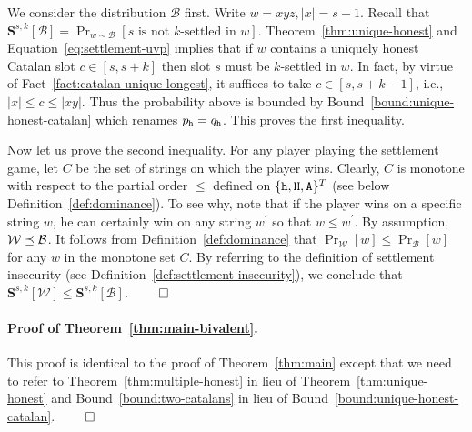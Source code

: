   We consider the distribution $\mathcal{B}$ first. 
  Write $w = xyz, |x| = s - 1$.
  Recall that  
  $
    \mathbf{S}^{s,k}[\mathcal{B}] 
    = \Pr_{w \sim \mathcal{B}}[\text{$s$ is not $k$-settled in $w$}]
  $. 
  Theorem~\ref{thm:unique-honest} and Equation~\eqref{eq:settlement-uvp} implies that 
  if $w$ contains a uniquely honest Catalan slot $c \in [s, s + k]$ 
  then slot $s$ must be $k$-settled in $w$. 
  In fact, by virtue of Fact~\ref{fact:catalan-unique-longest}, 
  it suffices to take $c \in [s, s + k - 1]$, 
  i.e., $|x| \leq c \leq |xy|$. 
  Thus the probability above is bounded by 
  Bound~\ref{bound:unique-honest-catalan} 
  which renames $p_{\mathtt{h}} = q_{\mathtt{h}}$.
  This proves the first inequality. 
  
  Now let us prove the second inequality. 
  For any player playing the settlement game, 
  let $C$ be the set of strings on which the player wins. 
  Clearly, $C$ is monotone 
  with respect to the partial order $\leq$ 
  defined on $\{\mathtt{h}, \mathtt{H}, \mathtt{A}\}^T$ 
  (see below Definition~\ref{def:dominance}).  
  To see why, note that if the player wins 
  on a specific string $w$, 
  he can certainly win on any string $w^\prime$ so that $w \leq w^\prime$. 
  By assumption, 
  $\mathcal{W} \preceq \mathcal{B}$. 
  It follows from Definition~\ref{def:dominance} that 
  $\Pr_{\mathcal{W}}[w] \leq \Pr_{\mathcal{B}}[w]$ 
  for any $w$ in the monotone set $C$. 
  By referring to the definition of settlement insecurity 
  (see Definition~\ref{def:settlement-insecurity}), 
  we conclude that 
  $
    \mathbf{S}^{s,k}[\mathcal{W}] \leq \mathbf{S}^{s,k}[\mathcal{B}]
  $.
  \hfill $\qed$  

\paragraph{Proof of Theorem~\ref{thm:main-bivalent}.}
  This proof is identical to the proof of Theorem~\ref{thm:main} 
  except that 
  we need to refer to Theorem~\ref{thm:multiple-honest} in lieu of Theorem~\ref{thm:unique-honest}
  and Bound~\ref{bound:two-catalans} in lieu of Bound~\ref{bound:unique-honest-catalan}.
  \hfill $\qed$  



